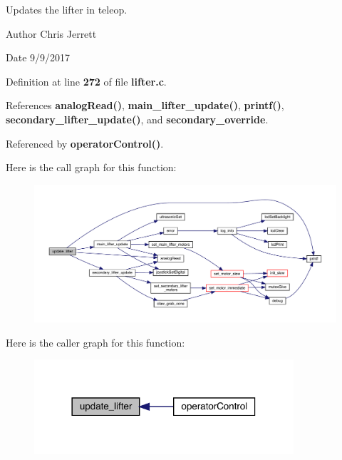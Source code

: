 Updates the lifter in teleop. 

\begin{DoxyAuthor}{Author}
Chris Jerrett 
\end{DoxyAuthor}
\begin{DoxyDate}{Date}
9/9/2017 
\end{DoxyDate}


Definition at line \textbf{ 272} of file \textbf{ lifter.\+c}.



References \textbf{ analog\+Read()}, \textbf{ main\+\_\+lifter\+\_\+update()}, \textbf{ printf()}, \textbf{ secondary\+\_\+lifter\+\_\+update()}, and \textbf{ secondary\+\_\+override}.



Referenced by \textbf{ operator\+Control()}.


Here is the call graph for this function\+:
\nopagebreak
\begin{figure}[H]
\begin{center}
\leavevmode
\includegraphics[width=350pt]{lifter_8c_a59bb7413777ca16aba124aaedf95c79b_cgraph}
\end{center}
\end{figure}
Here is the caller graph for this function\+:
\nopagebreak
\begin{figure}[H]
\begin{center}
\leavevmode
\includegraphics[width=273pt]{lifter_8c_a59bb7413777ca16aba124aaedf95c79b_icgraph}
\end{center}
\end{figure}


